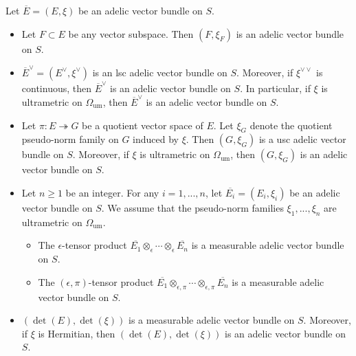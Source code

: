 \documentclass [11pt,reqno]{amsart}
\newcommand{\1}{\mathmybb{1}}
\def\um{\operatorname{um}}
\begin{document}
\begin{proposition}
\label{prop:constructions_adelic_vector_bundles}
Let $\overline{E}=(E,\xi)$ be an adelic vector bundle on $S$. 
\begin{itemize}
	\item[(1)] Let $F\subset E$ be any vector subspace. Then $(F,\xi_{F})$ is an adelic vector bundle on $S$.
	\item[(2)] $\overline{E}^{\vee} = (E^{\vee},\xi^{\vee})$ is an lsc adelic vector bundle on $S$. Moreover, if $\xi^{\vee\vee}$ is continuous, then $\overline{E}^{\vee}$ is an adelic vector bundle on $S$. In particular, if $\xi$ is ultrametric on $\Omega_{\um}$, then $\overline{E}^{\vee}$ is an adelic vector bundle on $S$.
	\item[(3)] Let $\pi: E \twoheadrightarrow G$ be a quotient vector space of $E$. Let $\xi_{G}$ denote the quotient pseudo-norm family on $G$ induced by $\xi$. Then $(G,\xi_G)$ is a usc adelic vector bundle on $S$. Moreover, if $\xi$ is ultrametric on $\Omega_{\um}$, then $(G,\xi_G)$ is an adelic vector bundle on $S$.
	\item[(4)] Let $n\geq 1$ be an integer. For any $i=1,...,n$, let $\overline{E_i}=(E_i,\xi_i)$ be an adelic vector bundle on $S$. We assume that the pseudo-norm families $\xi_1,...,\xi_n$ are ultrametric on $\Omega_{\um}$. 
	\begin{itemize}
		\item[(4.a)] The $\epsilon$-tensor product $\overline{E_1}\otimes_{\epsilon}\cdots\otimes_{\epsilon}\overline{E_n}$ is a measurable adelic vector bundle on $S$. 
		\item[(4.b)] The $(\epsilon,\pi)$-tensor product $\overline{E_1}\otimes_{\epsilon,\pi}\cdots\otimes_{\epsilon,\pi}\overline{E_n}$ is a measurable adelic vector bundle on $S$. 
	\end{itemize}
	\item[(5)] $(\det(E),\det(\xi))$ is a measurable adelic vector bundle on $S$. Moreover, if $\xi$ is Hermitian, then $(\det(E),\det(\xi))$ is an adelic vector bundle on $S$.	
\end{itemize}
\end{proposition}
\end{document}
